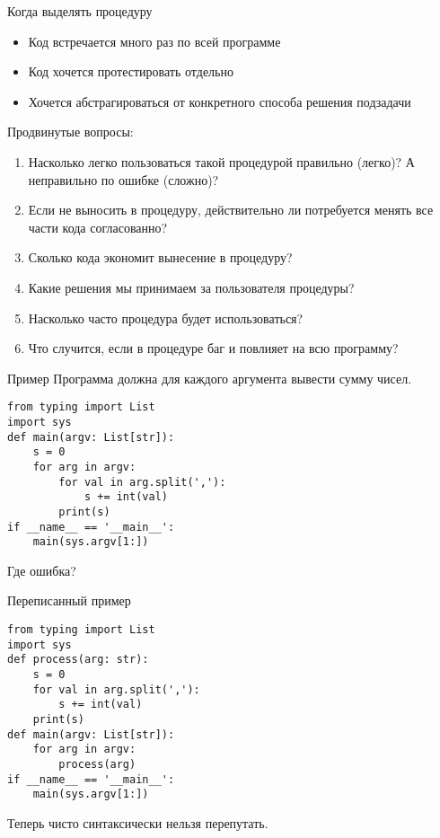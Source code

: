 \begin{frame}{Когда выделять процедуру}
	\begin{itemize}
	\item Код встречается много раз по всей программе
	\item Код хочется протестировать отдельно
	\item Хочется абстрагироваться от конкретного способа решения подзадачи
	\end{itemize}
	
	Продвинутые вопросы:
	\begin{enumerate}
	\item
		Насколько легко пользоваться такой процедурой правильно (легко)?
		А неправильно по ошибке (сложно)?
	\item
		Если не выносить в процедуру, действительно ли потребуется
		менять все части кода согласованно?
	\item
		Сколько кода экономит вынесение в процедуру?
	\item
		Какие решения мы принимаем за пользователя процедуры?
	\item
		Насколько часто процедура будет использоваться?
	\item
		Что случится, если в процедуре баг и повлияет на всю программу?
	\end{enumerate}
\end{frame}

\begin{frame}{Пример}
	Программа должна для каждого аргумента вывести сумму чисел.
\begin{verbatim}
from typing import List
import sys
def main(argv: List[str]):
    s = 0
    for arg in argv:
        for val in arg.split(','):
            s += int(val)
        print(s)
if __name__ == '__main__':
    main(sys.argv[1:])
\end{verbatim}
	Где ошибка?
\end{frame}

\begin{frame}{Переписанный пример}
\begin{verbatim}
from typing import List
import sys
def process(arg: str):
    s = 0
    for val in arg.split(','):
        s += int(val)
    print(s)
def main(argv: List[str]):
    for arg in argv:
        process(arg)
if __name__ == '__main__':
    main(sys.argv[1:])
\end{verbatim}
	Теперь чисто синтаксически нельзя перепутать.
\end{frame}

